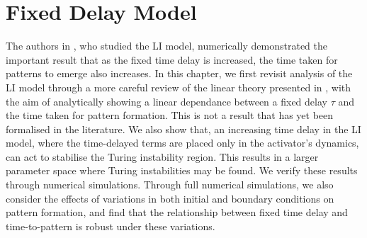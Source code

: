 \chapter{Fixed Delay Model}

The authors in \cite{gaffmonk}, who studied the LI model, numerically demonstrated the important result that as the fixed time delay is increased, the time taken for patterns to emerge also increases. In this chapter, we first revisit analysis of the LI model through a more careful review of the linear theory presented in \cite{yigaffneyli,jiang}, with the aim of analytically showing a linear dependance between a fixed delay $\tau$ and the time taken for pattern formation. This is not a result that has yet been formalised in the literature. We also show that, an increasing time delay in the LI model, where the time-delayed terms are placed only in the activator's dynamics, can act to stabilise the Turing instability region. This results in a larger parameter space where Turing instabilities may be found. We verify these results through numerical simulations. Through full numerical simulations, we also consider the effects of variations in both initial and boundary conditions on pattern formation, and find that the relationship between fixed time delay and time-to-pattern is robust under these variations.

